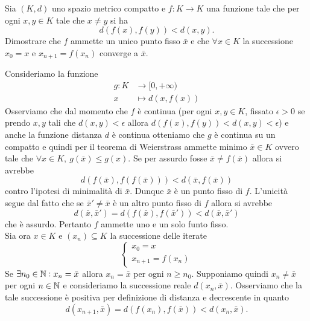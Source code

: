 \begin{es}
  Sia $ (K, d) $ uno spazio metrico compatto e $ f \colon K \to K $ una funzione tale che per ogni $ x, y \in K $ tale che $ x \neq y $ si ha \[d(f(x), f(y)) < d(x, y).\] Dimostrare che $ f $ ammette un unico punto fisso $ \bar{x} $ e che $ \forall x \in K $ la successione $ x_0 = x $ e $ x_{n + 1} = f(x_n) $ converge a $ \bar{x} $.
\end{es}
%
Consideriamo la funzione
\begin{align*}
  g \colon K & \to [0, +\infty) \\
  x & \mapsto d(x, f(x))
\end{align*}
Osserviamo che dal momento che $ f $ è continua (per ogni $ x, y \in K $, fissato $ \epsilon > 0 $ se prendo $ x, y $ tali che $ d(x, y) < \epsilon $ allora $ d(f(x), f(y)) < d(x, y) < \epsilon $) e anche la funzione distanza $ d $ è continua otteniamo che $ g $ è continua su un compatto e quindi per il teorema di Weierstrass ammette minimo $ \bar{x} \in K $ ovvero tale che $ \forall x \in K, \ g(\bar{x}) \leq g(x) $. Se per assurdo fosse $ \bar{x} \neq f(\bar{x}) $ allora si avrebbe
\begin{equation*}
  d(f(\bar{x}), f(f(\bar{x}))) < d(\bar{x}, f(\bar{x}))
\end{equation*}
contro l'ipotesi di minimalità di $ \bar{x} $. Dunque $ \bar{x} $ è un punto fisso di $ f $. L'unicità segue dal fatto che se $ \bar{x}' \neq \bar{x} $ è un altro punto fisso di $ f $ allora si avrebbe
\begin{equation*}
  d(\bar{x}, \bar{x}') = d(f(\bar{x}), f(\bar{x}')) < d(\bar{x}, \bar{x}')
\end{equation*}
che è assurdo. Pertanto $ f $ ammette uno e un solo funto fisso. \\
Sia ora $ x \in K $ e $ (x_n) \subseteq K $ la successione delle iterate
\begin{equation*}
  \begin{cases}
    x_0 = x \\
    x_{n + 1} = f(x_n)
  \end{cases}
\end{equation*}
Se $ \exists n_0 \in \mathbb{N} : x_n = \bar{x} $ allora $ x_n = \bar{x} $ per ogni $ n \geq n_0 $. Supponiamo quindi $ x_n \neq \bar{x} $ per ogni $ n \in \mathbb{N} $ e consideriamo la successione reale $ d(x_n, \bar{x}) $. Osserviamo che la tale successione è positiva per definizione di distanza e decrescente in quanto
\begin{equation*}
  d(x_{n + 1}, \bar{x}) = d(f(x_n), f(\bar{x})) < d(x_n, \bar{x}).
\end{equation*}
